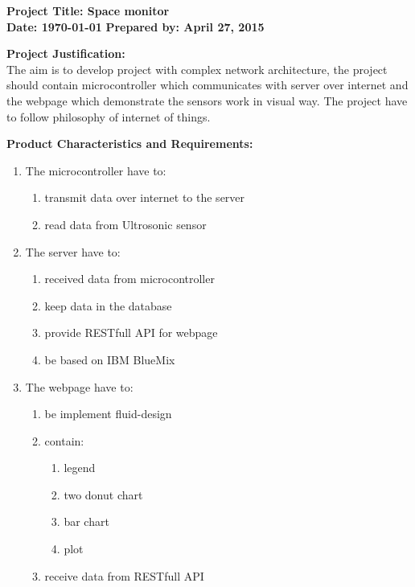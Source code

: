 \documentclass[english]{article}
\begin{document}
\begin{framed}
\textbf{Project Title:  Space monitor } \\
\textbf{Date: \today}
\textbf{Prepared by: April 27, 2015 }
\end{framed}
\begin{framed}
  \textbf{Project Justification:} \\
  The aim is to develop project with complex network architecture, the project should contain microcontroller which communicates with server over internet and the webpage which demonstrate the sensors work in visual way. The project have to follow philosophy of internet of things.
  \end{framed}
  \begin{framed}
   \textbf{Product Characteristics and Requirements:}
\begin{enumerate}
  \item The microcontroller have to:
  \begin{enumerate}
  \item transmit data over internet to the server
  \item read data from Ultrosonic sensor 
	\end{enumerate}
  \item The server have to:
    \begin{enumerate}
  \item received data from microcontroller
  \item keep data in the database
  \item provide RESTfull API for webpage
  \item be based on IBM BlueMix
	\end{enumerate}
  \item The webpage have to:
    \begin{enumerate}
  \item be implement fluid-design 
  \item contain:
  \begin{enumerate}
  \item legend
  \item two donut chart
  \item bar chart
  \item plot
	\end{enumerate}
  \item receive data from RESTfull API
	\end{enumerate}
\end{enumerate}
  \end{framed}
\end{document}
